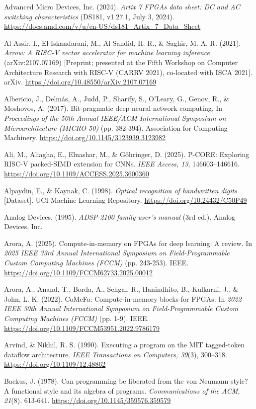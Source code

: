 \begin{apareferences}
Advanced Micro Devices, Inc. (2024). \emph{Artix 7 FPGAs data sheet: DC and AC switching characteristics} (DS181, v1.27.1, July 3, 2024). \url{https://docs.amd.com/v/u/en-US/ds181_Artix_7_Data_Sheet}

Al Assir, I., El Iskandarani, M., Al Sandid, H. R., \& Saghir, M. A. R. (2021). \emph{Arrow: A RISC-V vector accelerator for machine learning inference} (arXiv:2107.07169) {[}Preprint; presented at the Fifth Workshop on Computer Architecture Research with RISC-V (CARRV 2021), co-located with ISCA 2021{]}. arXiv. \url{https://doi.org/10.48550/arXiv.2107.07169}

Albericio, J., Delmás, A., Judd, P., Sharify, S., O'Leary, G., Genov, R., \& Moshovos, A. (2017). Bit-pragmatic deep neural network computing. In \emph{Proceedings of the 50th Annual IEEE/ACM International Symposium on Microarchitecture (MICRO-50)} (pp. 382-394). Association for Computing Machinery. \url{https://doi.org/10.1145/3123939.3123982}

Ali, M., Aliagha, E., Elnashar, M., \& Göhringer, D. (2025). P-CORE: Exploring RISC-V packed-SIMD extension for CNNs. \emph{IEEE Access, 13}, 146603–146616. \url{https://doi.org/10.1109/ACCESS.2025.3600360}

Alpaydin, E., \& Kaynak, C. (1998). \emph{Optical recognition of handwritten digits} {[}Dataset{]}. UCI Machine Learning Repository. \url{https://doi.org/10.24432/C50P49}

Analog Devices. (1995). \emph{ADSP-2100 family user's manual} (3rd ed.). Analog Devices, Inc.

Arora, A. (2025). Compute-in-memory on FPGAs for deep learning: A review. In \emph{2025 IEEE 33rd Annual International Symposium on Field-Programmable Custom Computing Machines (FCCM)} (pp. 243-253). IEEE. \url{https://doi.org/10.1109/FCCM62733.2025.00012}

Arora, A., Anand, T., Borda, A., Sehgal, R., Hanindhito, B., Kulkarni, J., \& John, L. K. (2022). CoMeFa: Compute-in-memory blocks for FPGAs. In \emph{2022 IEEE 30th Annual International Symposium on Field-Programmable Custom Computing Machines (FCCM)} (pp. 1-9). IEEE. \url{https://doi.org/10.1109/FCCM53951.2022.9786179}

Arvind, \& Nikhil, R. S. (1990). Executing a program on the MIT tagged-token dataflow architecture. \emph{IEEE Transactions on Computers, 39}(3), 300–318. \url{https://doi.org/10.1109/12.48862}

Backus, J. (1978). Can programming be liberated from the von Neumann style? A functional style and its algebra of programs. \emph{Communications of the ACM, 21}(8), 613-641. \url{https://doi.org/10.1145/359576.359579}


\end{apareferences}
